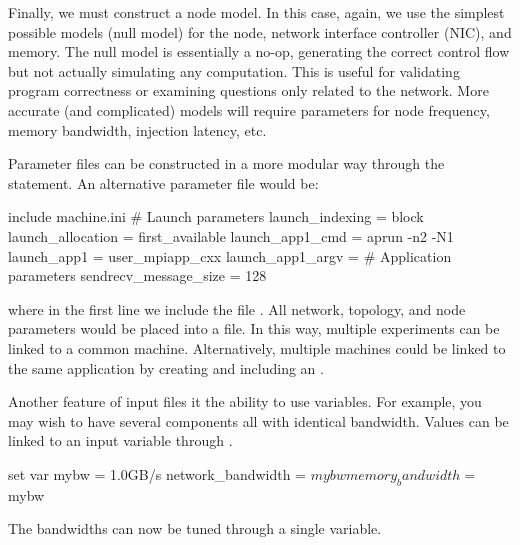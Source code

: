 Finally, we must construct a node model.  
In this case, again, we use the simplest possible models (null model) for the node, 
network interface controller (NIC), and memory.  
The null model is essentially a no-op, generating the correct control flow but not actually simulating any computation. 
This is useful for validating program correctness or examining questions only related to the network.  
More accurate (and complicated) models will require parameters for node frequency, memory bandwidth, injection latency, etc.

Parameter files can be constructed in a more modular way through the  statement.  
An alternative parameter file would be:

\begin{ViFile}
include machine.ini
# Launch parameters
launch_indexing = block
launch_allocation = first_available
launch_app1_cmd = aprun -n2 -N1
launch_app1 = user_mpiapp_cxx
launch_app1_argv = 
# Application parameters
sendrecv_message_size = 128
\end{ViFile}
where in the first line we include the file .  
All network, topology, and node parameters would be placed into a  file.  
In this way, multiple experiments can be linked to a common machine.  
Alternatively, multiple machines could be linked to the same application by creating and including an .

Another feature of input files it the ability to use variables.
For example, you may wish to have several components all with identical bandwidth.
Values can be linked to an input variable through .

\begin{ViFile}
set var mybw = 1.0GB/s
network_bandwidth = $mybw
memory_bandwidth = $mybw
\end{ViFile}
The bandwidths can now be tuned through a single variable.


